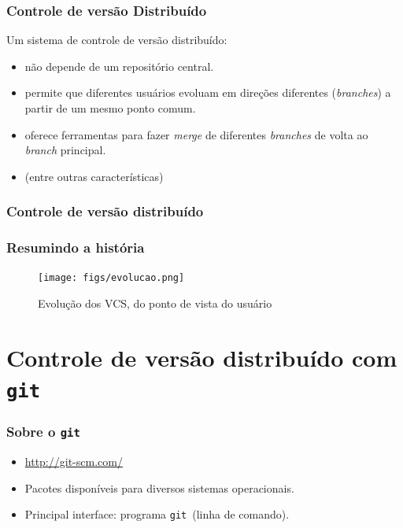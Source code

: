\documentclass{beamer}
\newcommand{\git}{\texttt{git}}
\begin{document}
\begin{frame}
  \frametitle{Controle de versão Distribuído}

  Um sistema de controle de versão distribuído:

  \begin{itemize}
      \pause
    \item não depende de um repositório central.
      \pause
    \item permite que diferentes usuários evoluam em direções diferentes
      (\emph{branches}) a partir de um mesmo ponto comum.
      \pause
    \item oferece ferramentas para fazer \emph{merge} de diferentes
      \emph{branches} de volta ao \emph{branch} principal.
      \pause
    \item (entre outras características)
  \end{itemize}
\end{frame}

\begin{frame}
  \frametitle{Controle de versão distribuído}
  \begin{figure}[h]
    \begin{center}
    \end{center}
    \label{fig:distributed-vcs}
  \end{figure}
\end{frame}

\begin{frame}
  \frametitle{Resumindo a história}
  \begin{figure}[h]
    \begin{center}
      \texttt{[image: figs/evolucao.png]}
    \end{center}
    \caption{Evolução dos VCS, do ponto de vista do usuário}
    \label{fig:evolucao}
  \end{figure}
\end{frame}

\section[\git]{Controle de versão distribuído com \git}

\begin{frame}
  \frametitle{Sobre o \git}
  \begin{itemize}
    \item \url{http://git-scm.com/}
    \item Pacotes disponíveis para diversos sistemas operacionais.
    \item Principal interface: programa \git\ (linha de comando).
  \end{itemize}
\end{frame}
\end{document}
